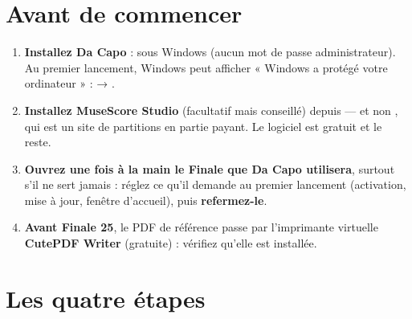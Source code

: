 \section{Avant de commencer}

\begin{enumerate}
\item \textbf{Installez Da Capo} :  sous Windows (aucun mot de passe
      administrateur). Au premier lancement, Windows peut afficher « Windows a protégé votre
      ordinateur » :  → .
\item \textbf{Installez MuseScore Studio} (facultatif mais conseillé) depuis 
      — et non , qui est un site de partitions en partie payant. Le logiciel
      est gratuit et le reste.
\item \textbf{Ouvrez une fois à la main le Finale que Da Capo utilisera}, surtout s'il ne sert jamais :
      réglez ce qu'il demande au premier lancement (activation, mise à jour, fenêtre d'accueil), puis
      \textbf{refermez-le}.
\item \textbf{Avant Finale 25}, le PDF de référence passe par l'imprimante virtuelle
      \textbf{CutePDF Writer} (gratuite) : vérifiez qu'elle est installée.
\end{enumerate}


\section{Les quatre étapes}


